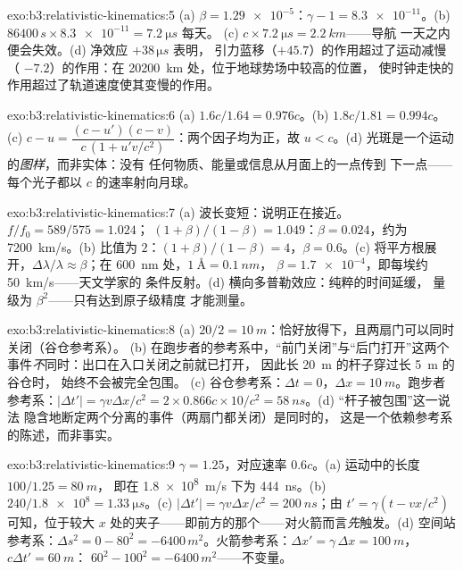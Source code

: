 \begin{solution}{exo:b3:relativistic-kinematics:5}
(a) $\beta = \num{1.29e-5}$：$\gamma - 1 = \num{8.3e-11}$。(b)
$86400\,\unit{s} \times \num{8.3e-11} = \qty{7.2}{\micro s}$ 每天。
(c) $c \times \qty{7.2}{\micro s} = \qty{2.2}{km}$——导航
一天之内便会失效。(d) 净效应 $+38\,\unit{\micro s}$ 表明，
引力蓝移（$+45.7$）的作用超过了运动减慢（
$-7.2$）的作用：在 \qty{20200}{km} 处，位于地球势场中较高的位置，
使时钟走快的作用超过了轨道速度使其变慢的作用。
\end{solution}

\begin{solution}{exo:b3:relativistic-kinematics:6}
(a) $1.6c/1.64 = 0.976c$。(b) $1.8c/1.81 = 0.994c$。(c) $c - u =
\dfrac{(c - u')(c - v)}{c\,(1 + u'v/c^2)}$：两个因子均为正，故
$u < c$。(d) 光斑是一个运动的\emph{图样}，而非实体：没有
任何物质、能量或信息从月面上的一点传到
下一点——每个光子都以 $c$ 的速率射向月球。
\end{solution}

\begin{solution}{exo:b3:relativistic-kinematics:7}
(a) 波长变短：说明正在接近。$f/f_0 = 589/575 = 1.024$；
$(1+\beta)/(1-\beta) = 1.049$：$\beta = 0.024$，约为
\qty{7200}{km/s}。(b) 比值为 $2$：$(1+\beta)/(1-\beta) = 4$，$\beta =
0.6$。(c) 将平方根展开，$\Delta\lambda/\lambda \approx
\beta$；在 \qty{600}{nm} 处，$\qty{1}{\angstrom} = \qty{0.1}{nm}$，
$\beta = \num{1.7e-4}$，即每埃约 \qty{50}{km/s}——天文学家的
条件反射。(d) 横向多普勒效应：纯粹的时间延缓，
量级为 $\beta^2$——只有达到原子级精度
才能测量。
\end{solution}

\begin{solution}{exo:b3:relativistic-kinematics:8}
(a) $20/2 = \qty{10}{m}$：恰好放得下，且两扇门可以同时关闭（谷仓参考系）。
(b) 在跑步者的参考系中，“前门关闭”与“后门打开”这两个
事件\emph{不}同时：出口在入口关闭之前就已打开，
因此长 \qty{20}{m} 的杆子穿过长 \qty{5}{m} 的谷仓时，
始终不会被完全包围。
(c) 谷仓参考系：$\Delta t = 0$，$\Delta x =
\qty{10}{m}$。跑步者参考系：$|\Delta t'| = \gamma v\Delta x/c^2 =
2 \times 0.866c \times 10/c^2 = \qty{58}{ns}$。(d) “杆子被包围”这一说法
隐含地断定两个分离的事件（两扇门都关闭）是同时的，
这是一个依赖参考系的陈述，而非事实。
\end{solution}

\begin{solution}{exo:b3:relativistic-kinematics:9}
$\gamma = 1.25$，对应速率 $0.6c$。(a) 运动中的长度 $100/1.25 = \qty{80}{m}$，
即在 \qty{1.8e8}{m/s} 下为 \qty{444}{ns}。(b) $240/\num{1.8e8} =
\qty{1.33}{\micro s}$。(c) $|\Delta t'| = \gamma v\Delta x/c^2 =
\qty{200}{ns}$；由 $t' = \gamma(t - vx/c^2)$ 可知，位于较大
$x$ 处的夹子——即前方的那个——对火箭而言\emph{先}触发。(d)
空间站参考系：$\Delta s^2 = 0 - 80^2 = -6400\,\unit{m^2}$。火箭参考系：$\Delta
x' = \gamma\,\Delta x = \qty{100}{m}$，$c\Delta t' = \qty{60}{m}$：
$60^2 - 100^2 = -6400\,\unit{m^2}$——不变量。
\end{solution}

